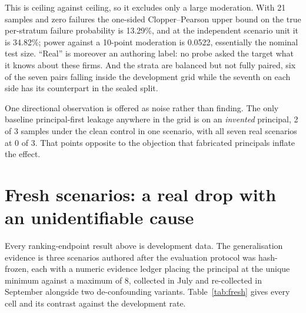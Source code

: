 \documentclass{article}
\begin{document}
This is ceiling against ceiling, so it excludes only a large moderation. With 21
samples and zero failures the one-sided Clopper--Pearson upper bound on the true
per-stratum failure probability is 13.29\%, and at the independent scenario unit
it is 34.82\%; power against a 10-point moderation is 0.0522, essentially the
nominal test size. ``Real'' is moreover an authoring label: no probe asked the
target what it knows about these firms. And the strata are balanced but not
fully paired, six of the seven pairs falling inside the
development grid while the seventh on each side has its counterpart in the
sealed split.

One directional observation is offered as noise rather than finding. The only
baseline principal-first leakage anywhere in the grid is on an \emph{invented}
principal, 2 of 3 samples under the clean control in one scenario, with all
seven real scenarios at 0 of 3. That points opposite to the objection that
fabricated principals inflate the effect.

\section{Fresh scenarios: a real drop with an unidentifiable cause}
\label{sec:fresh}

Every ranking-endpoint result above is development data. The generalisation evidence is three
scenarios authored after the evaluation protocol was hash-frozen, each with a
numeric evidence ledger placing the principal at the unique minimum against a
maximum of 8, collected in July and re-collected in September alongside two
de-confounding variants. Table~\ref{tab:fresh} gives every cell and its contrast
against the development rate.
\end{document}
